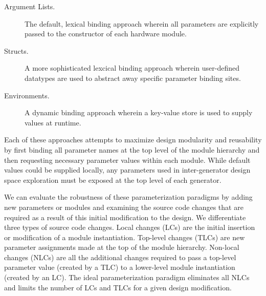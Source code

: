 \begin{description}
\item[Argument Lists.] The default, lexical binding approach wherein all parameters are explicitly passed to the constructor of each hardware module.
\item[Structs.] A more sophisticated lexcical binding approach wherein user-defined datatypes are used to abstract away specific parameter binding sites.
\item[Environments.] A dynamic binding approach wherein a key-value store is used to supply values at runtime.
\end{description}

Each of these approaches attempts to maximize design modularity and reusability by first binding all parameter names at the top level of the module hierarchy and then requesting necessary parameter values within each module. 
While default values could be supplied locally, any parameters used in inter-generator design space exploration must be exposed at the top level of each generator.



We can evaluate the robustness of these parameterization paradigms by adding new parameters or modules and examining the source code changes that are required as a result of this initial modification to the design.
We differentiate three types of source code changes.
Local changes (LCs) are the initial insertion or modification of a module instantiation. 
Top-level changes (TLCs) are new parameter assignments made at the top  of the module hierarchy. 
Non-local changes (NLCs) are all the additional changes required to pass a top-level parameter value (created by a TLC) to a lower-level module instantiation (created by an LC). 
The ideal parameterization paradigm eliminates all NLCs and limits the number of LCs and TLCs for a given design modification.

